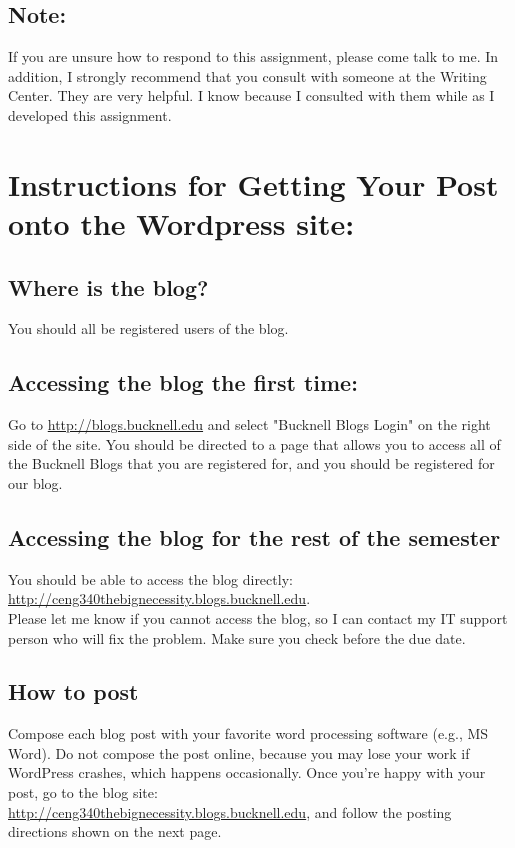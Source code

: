 \documentclass[12pt,letterpaper]{article}
\begin{document}
\subsection *{Note:}
If you are unsure how to respond to this assignment, please come talk to me.  In addition, I strongly recommend that you consult with someone at the Writing Center.  They are very helpful.  I know because I consulted with them while as I developed this assignment.

\section *{Instructions for Getting Your Post onto the Wordpress site:}
\subsection *{Where is the blog?}
You should all be registered users of the blog.\\

\subsection *{Accessing the blog the first time:}
 Go to
 \href{http://blogs.bucknell.edu}{http://blogs.bucknell.edu} and select "Bucknell Blogs Login" on the right side of the site.  You should be directed to a page that allows you to access all of the  Bucknell Blogs that you are registered for, and you should be registered for our blog. 
 
\subsection *{Accessing the blog for the rest of the semester}
You should be able to access the blog directly:
\href{http://ceng340thebignecessity.blogs.bucknell.edu}{http://ceng340thebignecessity.blogs.bucknell.edu}.\\

Please let me know if you cannot access the blog, so I can contact my IT support person who will fix the problem. Make sure you check before the due date.

\subsection *{How to post}
Compose each blog post with your favorite word processing software (e.g., MS Word).  Do not compose the post online, because you may lose your work if WordPress crashes, which happens occasionally. Once you're happy with your post, go to the blog site:\\
 \href{http://ceng340thebignecessity.blogs.bucknell.edu}{http://ceng340thebignecessity.blogs.bucknell.edu}, and follow the posting directions shown on the next page.
\end{document}
